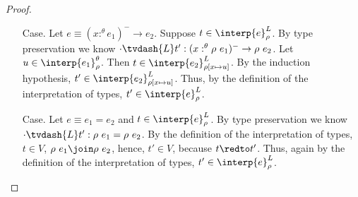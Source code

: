 \begin{proof}
\begin{itemize}
  \item[Case.] Let $e \equiv (x :^\theta e_1)^- \to e_2$.
    Suppose $t \in \interp{e}^L_\rho$.  By type preservation we know 
    $\cdot \tvdash{L} t':(x :^\theta \rho\ e_1)^- \to \rho\ e_2$.
    Let $u \in \interp{e_1}^\theta_\rho$. Then 
    $t \in \interp{e_2}^L_{\rho[x \mapsto u]}$.  By the induction hypothesis,
    $t' \in \interp{e_2}^L_{\rho[x \mapsto u]}$.  Thus, by the definition
    of the interpretation of types, $t' \in \interp{e}^L_\rho$.
      
  \item[Case.] Let $e \equiv e_1 = e_2$ and $t \in \interp{e}^L_\rho$.  
    By type preservation we know 
    $\cdot \tvdash{L} t':\rho\ e_1 = \rho\ e_2$.  By the definition of the 
    interpretation of types, $t \in V$, $\rho\ e_1 \join \rho\ e_2$, hence, 
    $t' \in V$, because $t \redto t'$.  Thus, again by the definition 
    of the interpretation of types, $t' \in \interp{e}^L_\rho$.    
  \end{itemize}
\end{proof}

